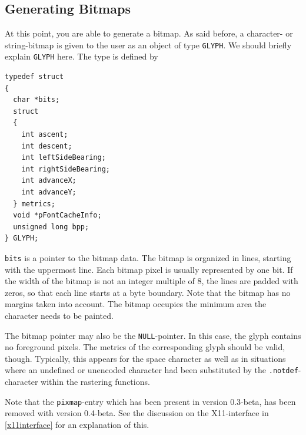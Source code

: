 \subsection{Generating Bitmaps}
\label{generatingbitmaps}%
At this point, you are able to generate a bitmap.
As said before, a character- or string-bitmap is given to the user as
an object of type \verb+GLYPH+. We should briefly explain \verb+GLYPH+
here. The type is defined by
\begin{verbatim}
typedef struct
{
  char *bits; 
  struct          
  {
    int ascent;
    int descent;
    int leftSideBearing;
    int rightSideBearing;
    int advanceX;
    int advanceY;
  } metrics;
  void *pFontCacheInfo;
  unsigned long bpp;
} GLYPH;
\end{verbatim}
\verb+bits+ is a pointer to the bitmap data. The
bitmap is organized in lines, starting with the uppermost line.
Each bitmap pixel is usually represented by one bit. If the width of
the 
bitmap is not an integer multiple of 8, the lines are padded with
zeros, so that each line starts at a byte boundary. Note that the
bitmap has no margins taken into account. The bitmap occupies the
minimum area the character needs to be painted. 

The bitmap pointer may also be
the \verb+NULL+-pointer. In this case, the glyph contains no foreground
pixels. The metrics of the corresponding glyph should be valid,
though. Typically, this appears for the space character as well as in
situations where an undefined or unencoded character had been substituted by
the \verb+.notdef+-character within the rastering functions.

Note that the \verb+pixmap+-entry which has been present in version 0.3-beta,
has been removed with version 0.4-beta. See the discussion on the X11-interface
in \ref{x11interface} for an explanation of this.

